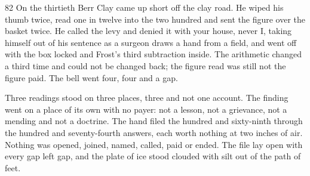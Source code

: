 \begin{CRchronicle}{82}
On the thirtieth Berr Clay came up short off the clay road. He wiped his thumb twice, read one in twelve into the two hundred and sent the figure over the basket twice. He called the levy and denied it with your house, never I, taking himself out of his sentence as a surgeon draws a hand from a field, and went off with the box locked and Frost’s third subtraction inside. The arithmetic changed a third time and could not be changed back; the figure read was still not the figure paid. The bell went four, four and a gap.

Three readings stood on three places, three and not one account. The finding went on a place of its own with no payer: not a lesson, not a grievance, not a mending and not a doctrine. The hand filed the hundred and sixty-ninth through the hundred and seventy-fourth answers, each worth nothing at two inches of air. Nothing was opened, joined, named, called, paid or ended. The file lay open with every gap left gap, and the plate of ice stood clouded with silt out of the path of feet.
\end{CRchronicle}
